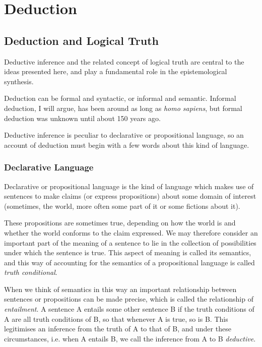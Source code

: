 \documentclass[10pt,titlepage]{book}
\begin{document}
\chapter{Deduction}

\section{Deduction and Logical Truth}

Deductive inference and the related concept of logical truth are central to the ideas presented here, and play a fundamental role in the epistemological synthesis.

Deduction can be formal and syntactic, or informal and semantic.
Informal deduction, I will argue, has been around as long as \emph{homo sapiens}, but formal deduction was unknown until about 150 years ago.

Deductive inference is peculiar to declarative or propositional language, so an account of deduction must begin with a few words about this kind of language.

\subsection{Declarative Language}

Declarative or propositional language is the kind of language which makes use of sentences to make claims (or express propositions) about some domain of interest (sometimes, the world, more often some part of it or some fictions about it).

These propositions are sometimes true, depending on how the world is and whether the world conforms to the claim expressed.
We may therefore consider an important part of the meaning of a sentence to lie in the collection of possibilities under which the sentence is true.
This aspect of meaning is called its semantics, and this way of accounting for the semantics of a propositional language is called \emph{truth conditional}.

When we think of semantics in this way an important relationship between sentences or propositions can be made precise, which is called the relationship of \emph{entailment}.
A sentence A entails some other sentence B if the truth conditions of A are all truth conditions of B, so that whenever A is true, so is B.
This legitimises an inference from the truth of A to that of B, and under these circumstances, i.e. when A entails B, we call the inference from A to B \emph{deductive}.
\end{document}
